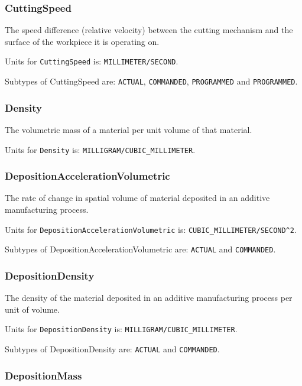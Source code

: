 \subsubsection{CuttingSpeed}
  \label{sec:CuttingSpeed}


The speed difference (relative velocity) between the cutting mechanism and the surface of the workpiece it is operating on.


Units for \texttt{CuttingSpeed} is: \texttt{MILLIMETER/SECOND}.


Subtypes of CuttingSpeed are: \texttt{ACTUAL}, \texttt{COMMANDED}, \texttt{PROGRAMMED} and \texttt{PROGRAMMED}. 
\FloatBarrier

\subsubsection{Density}
  \label{sec:Density}


The volumetric mass of a material per unit volume of that material.


Units for \texttt{Density} is: \texttt{MILLIGRAM/CUBIC_MILLIMETER}.

\FloatBarrier

\subsubsection{DepositionAccelerationVolumetric}
  \label{sec:DepositionAccelerationVolumetric}


The rate of change in spatial volume of material deposited in an additive manufacturing process.


Units for \texttt{DepositionAccelerationVolumetric} is: \texttt{CUBIC_MILLIMETER/SECOND\^{}2}.


Subtypes of DepositionAccelerationVolumetric are: \texttt{ACTUAL} and \texttt{COMMANDED}. 
\FloatBarrier

\subsubsection{DepositionDensity}
  \label{sec:DepositionDensity}


The density of the material deposited in an additive manufacturing process per unit of volume.


Units for \texttt{DepositionDensity} is: \texttt{MILLIGRAM/CUBIC_MILLIMETER}.


Subtypes of DepositionDensity are: \texttt{ACTUAL} and \texttt{COMMANDED}. 
\FloatBarrier

\subsubsection{DepositionMass}
  \label{sec:DepositionMass}



